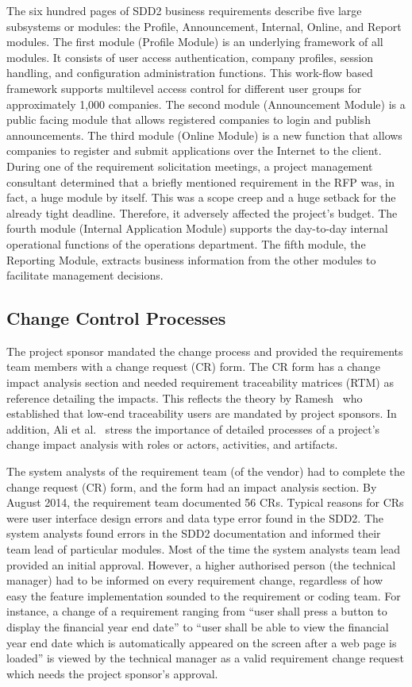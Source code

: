\documentclass[conference]{IEEEtran}
\begin{document}
The six hundred pages of SDD2 business requirements describe five
large subsystems or modules: the Profile, Announcement, Internal,
Online, and Report modules. The first module (Profile Module) is an
underlying framework of all modules. It consists of user access
authentication, company profiles, session handling, and configuration
administration functions. This work-flow based framework supports
multilevel access control for different user groups for approximately
1,000 companies. The second module (Announcement Module) is a public
facing module that allows registered companies to login and publish
announcements.  The third module (Online Module) is a new function
that allows companies to register and submit applications over the
Internet to the client. During one of the requirement solicitation
meetings, a project management consultant determined that a briefly
mentioned requirement in the RFP was, in fact, a huge module by
itself. This was a scope creep and a huge setback for the already
tight deadline. Therefore, it adversely affected the project's
budget. The fourth module (Internal Application Module) supports the
day-to-day internal operational functions of the operations
department. The fifth module, the Reporting Module, extracts business
information from the other modules to facilitate management decisions.

\subsection{Change Control Processes}

The project sponsor mandated the change process and provided the
requirements team members with a change request (CR) form. The CR form
has a change impact analysis section and needed requirement
traceability matrices (RTM) as reference detailing the impacts. This
reflects the theory by Ramesh~\cite{ramesh1998factors} who established
that low-end traceability users are mandated by project sponsors. In
addition, Ali et al.~\cite{ali2013assessing} stress the importance of
detailed processes of a project's change impact analysis with roles or
actors, activities, and artifacts.

The system analysts of the requirement team (of the vendor) had to
complete the change request (CR) form, and the form had an impact
analysis section. By August 2014, the requirement team documented 56
CRs. Typical reasons for CRs were user interface design errors and
data type error found in the SDD2. The system analysts found errors in
the SDD2 documentation and informed their team lead of particular
modules. Most of the time the system analysts team lead provided an
initial approval. However, a higher authorised person (the technical
manager) had to be informed on every requirement change, regardless of
how easy the feature implementation sounded to the requirement or
coding team. For instance, a change of a requirement ranging from
``user shall press a button to display the financial year end date''
to ``user shall be able to view the financial year end date which is
automatically appeared on the screen after a web page is loaded'' is
viewed by the technical manager as a valid requirement change request
which needs the project sponsor's approval.
\end{document}

